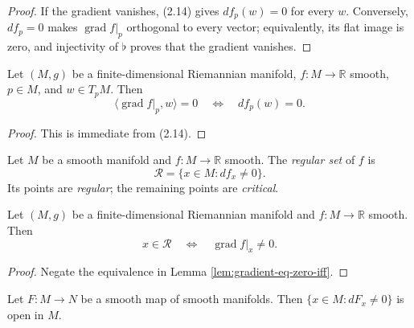 \begin{proof}
\leanok
{}
\sketch If the gradient vanishes, (2.14) gives $df_p(w)=0$ for every $w$. Conversely,
$df_p=0$ makes $\operatorname{grad}f|_p$ orthogonal to every vector; equivalently,
its flat image is zero, and injectivity of $\flat$ proves that the gradient vanishes.
\end{proof}

\begin{lemma}
\label{lem:gradient-orthogonal-iff}
\leanok
{}
Let $(M,g)$ be a finite-dimensional Riemannian manifold, $f\colon M\to\mathbb R$
smooth, $p\in M$, and $w\in T_pM$. Then
\[
\langle\operatorname{grad}f|_p,w\rangle=0
\quad\Longleftrightarrow\quad df_p(w)=0.
\]
\end{lemma}

\begin{proof}
\leanok
{}
\sketch This is immediate from (2.14).
\end{proof}

\begin{definition}
\label{def:regular-set}
\leanok
Let $M$ be a smooth manifold and $f\colon M\to\mathbb R$ smooth. The
\emph{regular set} of $f$ is
\[
\mathcal R=\{x\in M:df_x\ne0\}.
\]
Its points are \emph{regular}; the remaining points are \emph{critical}.
\end{definition}

\begin{lemma}
\label{lem:regular-set-eq-gradient-nonvanishing}
\leanok
{}
Let $(M,g)$ be a finite-dimensional Riemannian manifold and $f\colon M\to\mathbb R$
smooth. Then
\[
x\in\mathcal R\quad\Longleftrightarrow\quad\operatorname{grad}f|_x\ne0.
\]
\end{lemma}

\begin{proof}
\leanok
{}
\sketch Negate the equivalence in Lemma \ref{lem:gradient-eq-zero-iff}.
\end{proof}

\begin{lemma}
\label{lem:mfderiv-nonvanishing-open}
\leanok
Let $F\colon M\to N$ be a smooth map of smooth manifolds. Then
$\{x\in M:dF_x\ne0\}$ is open in $M$.
\end{lemma}

